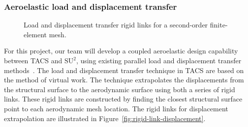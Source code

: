 \documentclass[]{aiaa-tc}
\begin{document}
\subsubsection{Aeroelastic load and displacement transfer}

\begin{figure}
  \centering
  \caption{Load and displacement transfer rigid links for a
    second-order finite-element mesh.}
\end{figure}

For this project, our team will develop a coupled aeroelastic design
capability between TACS and $\text{SU}^2$, using existing parallel
load and displacement transfer
methods~\cite{Kennedy:2014:tacs-tripan}. The load and displacement
transfer technique in TACS are based on the method of virtual
work. The technique extrapolates the displacements from the structural
surface to the aerodynamic surface using both a series of rigid
links. These rigid links are constructed by finding the closest
structural surface point to each aerodynamic mesh location. The rigid
links for displacement extrapolation are illustrated in
Figure~\ref{fig:rigid-link-displacement}.
\end{document}
